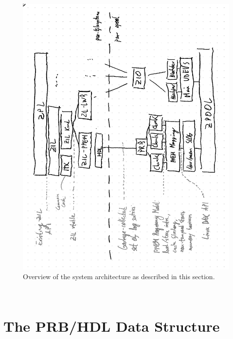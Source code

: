 \documentclass[12pt,a4paper,twoside]{book}
\begin{document}
\begin{figure}[H]
    \includegraphics{fig/zilpmem_architecture_overview}
    \caption{Overview of the system architecture as described in this section.}
\end{figure}~

\chapter{The PRB/HDL Data Structure}\label{ch:prbhdl}
\end{document}
